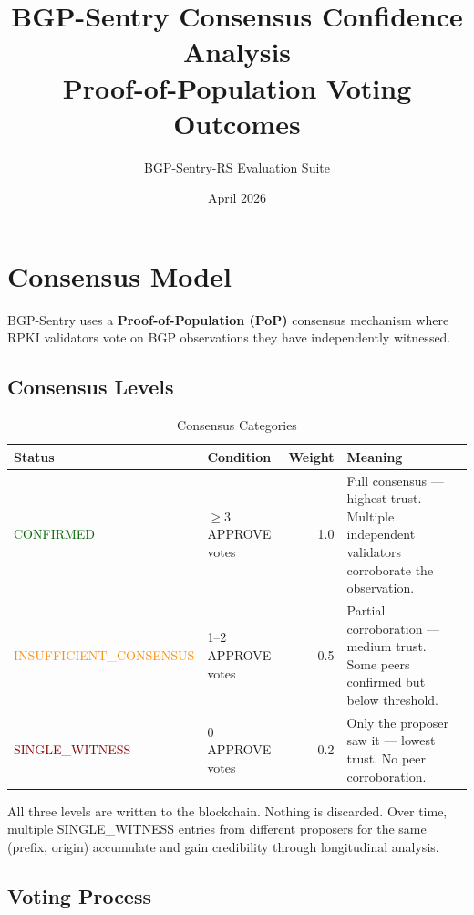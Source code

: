 \documentclass[11pt,a4paper]{article}
\title{\textbf{BGP-Sentry Consensus Confidence Analysis\\[0.3em]\large Proof-of-Population Voting Outcomes}}
\author{BGP-Sentry-RS Evaluation Suite}
\date{April 2026}
\begin{document}
\maketitle
\tableofcontents
\newpage

\section{Consensus Model}

BGP-Sentry uses a \textbf{Proof-of-Population (PoP)} consensus mechanism where
RPKI validators vote on BGP observations they have independently witnessed.

\subsection{Consensus Levels}

\begin{table}[H]
\centering
\caption{Consensus Categories}
\begin{tabularx}{\textwidth}{llrX}
\toprule
\textbf{Status} & \textbf{Condition} & \textbf{Weight} & \textbf{Meaning} \\
\midrule
\textcolor{darkgreen}{CONFIRMED}    & $\geq$3 APPROVE votes & 1.0 & Full consensus --- highest trust. Multiple independent validators corroborate the observation. \\
\textcolor{darkorange}{INSUFFICIENT\_CONSENSUS} & 1--2 APPROVE votes & 0.5 & Partial corroboration --- medium trust. Some peers confirmed but below threshold. \\
\textcolor{darkred}{SINGLE\_WITNESS} & 0 APPROVE votes & 0.2 & Only the proposer saw it --- lowest trust. No peer corroboration. \\
\bottomrule
\end{tabularx}
\end{table}

All three levels are written to the blockchain. Nothing is discarded. Over time,
multiple SINGLE\_WITNESS entries from different proposers for the same (prefix, origin)
accumulate and gain credibility through longitudinal analysis.

\subsection{Voting Process}
\end{document}

